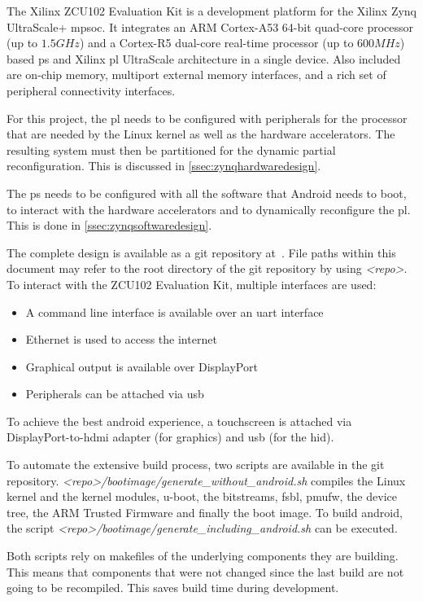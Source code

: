 The Xilinx ZCU102 Evaluation Kit is a development platform for the Xilinx Zynq UltraScale+ \gls{mpsoc}.
It integrates an ARM Cortex-A53 64-bit quad-core processor (up to $1.5 GHz$) and a Cortex-R5 dual-core real-time processor (up to $600 MHz$) based \gls{ps} and Xilinx \gls{pl} UltraScale architecture in a single device. Also included are on-chip memory, multiport external memory interfaces, and a rich set of peripheral connectivity interfaces.

For this project, the \gls{pl} needs to be configured with peripherals for the
processor that are needed by the Linux kernel as well as the hardware
accelerators.
The resulting system must then be partitioned for the dynamic partial
reconfiguration.
This is discussed in \cref{ssec:zynqhardwaredesign}.

The \gls{ps} needs to be configured with all the software that Android needs to
boot, to interact with the hardware accelerators and to dynamically reconfigure
the \gls{pl}.
This is done in \cref{ssec:zynqsoftwaredesign}.

The complete design is available as a git repository at~\cite{repo}.
File paths within this document may refer to the root directory of the git
repository by using \emph{<repo>}.
To interact with the ZCU102 Evaluation Kit, multiple interfaces are used:
\begin{itemize}
	\item A command line interface is available over an \gls{uart} interface
	\item Ethernet is used to access the internet
	\item Graphical output is available over DisplayPort
	\item Peripherals can be attached via \gls{usb}
\end{itemize}

To achieve the best android experience, a touchscreen is attached via DisplayPort-to-\gls{hdmi} adapter (for graphics) and \gls{usb} (for the \gls{hid}).

To automate the extensive build process, two scripts are available in the git
repository.
\emph{<repo>/bootimage/generate\_without\_android.sh} compiles the Linux kernel and the kernel modules, u-boot, the bitstreams, \gls{fsbl}, \gls{pmufw}, the device tree, the ARM Trusted Firmware and finally the boot image. To build android, the script \emph{<repo>/bootimage/generate\_including\_android.sh} can be executed.

Both scripts rely on makefiles of the underlying components they are building. This means that components that were not changed since the last build are not going to be recompiled. This saves build time during development.

